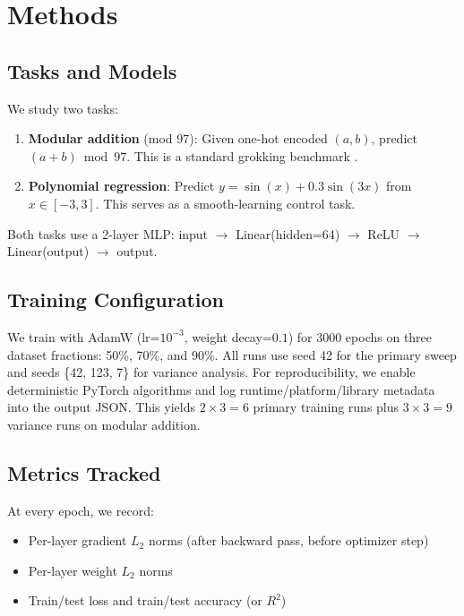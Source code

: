 \documentclass[11pt,a4paper]{article}
\begin{document}
\section{Methods}

\subsection{Tasks and Models}

We study two tasks:
\begin{enumerate}
    \item \textbf{Modular addition} (mod 97): Given one-hot encoded $(a, b)$, predict $(a + b) \bmod 97$. This is a standard grokking benchmark \citep{power2022grokking}.
    \item \textbf{Polynomial regression}: Predict $y = \sin(x) + 0.3\sin(3x)$ from $x \in [-3, 3]$. This serves as a smooth-learning control task.
\end{enumerate}

Both tasks use a 2-layer MLP: input $\to$ Linear(hidden=64) $\to$ ReLU $\to$ Linear(output) $\to$ output.

\subsection{Training Configuration}

We train with AdamW (lr=$10^{-3}$, weight decay=$0.1$) for 3000 epochs on three dataset fractions: 50\%, 70\%, and 90\%. All runs use seed 42 for the primary sweep and seeds \{42, 123, 7\} for variance analysis. For reproducibility, we enable deterministic PyTorch algorithms and log runtime/platform/library metadata into the output JSON. This yields $2 \times 3 = 6$ primary training runs plus $3 \times 3 = 9$ variance runs on modular addition.

\subsection{Metrics Tracked}

At every epoch, we record:
\begin{itemize}
    \item Per-layer gradient $L_2$ norms (after backward pass, before optimizer step)
    \item Per-layer weight $L_2$ norms
    \item Train/test loss and train/test accuracy (or $R^2$)
\end{itemize}
\end{document}

